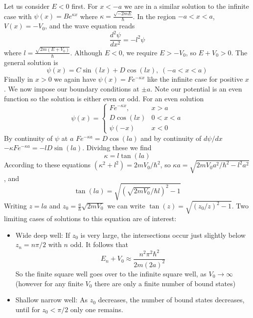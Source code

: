 \documentclass[12pt, a4paper, oneside, openright, titlepage]{book}
\begin{document}
Let us consider $E < 0$ first. For $x < -a$ we are in a similar solution to the infinite case with $\psi(x) = Be^{\kappa x}$ where $\kappa = \frac{\sqrt{-2mE}}{\hbar}$. In the region $-a < x < a$, $V(x) = -V_0$, and the wave equation reads \begin{equation*}
    \frac{d^2\psi}{dx^2} = -l^2\psi
\end{equation*}
where $l = \frac{\sqrt{2m(E+V_0)}}{\hbar}$. Although $E < 0$, we require $E > -V_0$, so $E+V_0 > 0$. The general solution is $$\psi(x) = C\sin(lx) + D\cos(lx),\;(-a < x < a)$$
Finally in $x > 0$ we again have $\psi(x) = Fe^{-\kappa x}$ like the infinite case for positive $x$. We now impose our boundary conditions at $\pm a$. Note our potential is an even function so the solution is either even or odd. For an even solution \begin{equation*}
    \psi(x) = \left\{\begin{array}{cc} Fe^{-\kappa x}, & x  > a \\ D\cos(lx) & 0 < x < a \\ \psi(-x) & x < 0 \end{array}\right.
\end{equation*}
By continuity of $\psi$ at $a$ $Fe^{-\kappa a} = D\cos(la)$ and by continuity of $d\psi/dx$ $-\kappa Fe^{-\kappa a} = -lD\sin(la)$. Dividng these we find $$\kappa = l\tan(la)$$
According to these equations $(\kappa^2+l^2) = 2mV_0/\hbar^2$, so $\kappa a = \sqrt{2mV_0a^2/\hbar^2 - l^2a^2}$, and $$\tan(la) = \sqrt{(\sqrt{2mV_0}/\hbar l)^2-1}$$
Writing $z = la$ and $z_0 = \frac{a}{\hbar}\sqrt{2mV_0}$ we can write $\tan(z) = \sqrt{(z_0/z)^2-1}$. Two limiting cases of solutions to this equation are of interest:
\begin{itemize}
    \item Wide deep well: If $z_0$ is very large, the intersections occur just slightly below $z_n = n\pi/2$ with $n$ odd. It follows that $$E_n+V_0\approx \frac{n^2\pi^2\hbar^2}{2m(2a)^2}$$
        So the finite square well goes over to the infinite square well, as $V_0\rightarrow \infty$ (however for any finite $V_0$ there are only a finite number of bound states)
    \item Shallow narrow well: As $z_0$ decreases, the number of bound states decreases, until for $z_0 < \pi/2$ only one remains.
\end{itemize}
\end{document}
